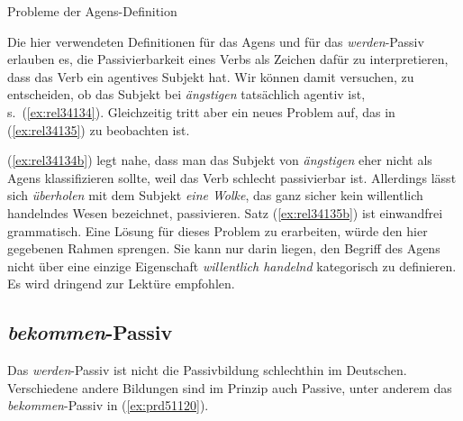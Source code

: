\begin{Vertiefung}{Probleme der Agens-Definition}

  \label{vert:agensprobleme}

\noindent Die hier verwendeten Definitionen für das Agens und für das \textit{werden}-Passiv erlauben es, die Passivierbarkeit eines Verbs als Zeichen dafür zu interpretieren, dass das Verb ein agentives Subjekt hat.
Wir können damit versuchen, zu entscheiden, ob das Subjekt bei \textit{ängstigen} tatsächlich agentiv ist, s.\ (\ref{ex:rel34134}).
Gleichzeitig tritt aber ein neues Problem auf, das in (\ref{ex:rel34135}) zu beobachten ist.

\begin{exe}
  \ex\label{ex:rel34134} 
  \begin{xlist}
  \end{xlist}
  \ex\label{ex:rel34135} 
  \begin{xlist}
  \end{xlist}
\end{exe}

(\ref{ex:rel34134b}) legt nahe, dass man das Subjekt von \textit{ängstigen} eher nicht als Agens klassifizieren sollte, weil das Verb schlecht passivierbar ist.
Allerdings lässt sich \textit{überholen} mit dem Subjekt \textit{eine Wolke}, das ganz sicher kein willentlich handelndes Wesen bezeichnet, passivieren.
Satz (\ref{ex:rel34135b}) ist einwandfrei grammatisch.
Eine Lösung für dieses Problem zu erarbeiten, würde den hier gegebenen Rahmen sprengen.
Sie kann nur darin liegen, den Begriff des Agens nicht über eine einzige Eigenschaft \textit{willentlich handelnd} kategorisch zu definieren.
Es wird dringend \citet{Dowty91} zur Lektüre empfohlen.

\end{Vertiefung}

\subsection{\textit{bekommen}-Passiv}

\label{sec:bekommenpassiv}

Das \textit{werden}-Passiv ist nicht die Passivbildung schlechthin im Deutschen.
Verschiedene andere Bildungen sind im Prinzip auch Passive, unter anderem das \textit{bekommen}-Passiv in (\ref{ex:prd51120}).

